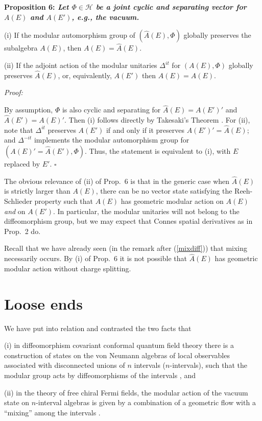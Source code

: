 \documentclass[12pt]{article}
\def \HH {\mathcal{H}}
\def \QED {\hspace*{\fill}$\square$\medskip}
\begin{document}
{\bf Proposition 6: \sl Let $\Phi\in\HH$ be a joint cyclic and
  separating vector for $A(E)$ and $A(E')$, e.g., the vacuum. 

(i) If the modular automorphism group of $(\widehat A(E),\Phi)$ globally
  preserves the subalgebra $A(E)$, then $A(E)=\widehat A(E)$.

(ii) If the adjoint action of the modular unitaries $\Delta^{it}$ for
  $(A(E),\Phi)$ globally preserves $\widehat A(E)$, or, equivalently,
  $A(E')$ then $A(E)=\widehat A(E)$. 

\medskip

\it Proof:} By assumption, $\Phi$ is also cyclic and separating 
for $\widehat A(E)=A(E')'$ and $\widehat A(E')=A(E)'$. Then (i)
follows directly by Takesaki's Theorem \cite[Chap.\ IX, Thm.\ 4.2]{T}. 
For (ii), note that $\Delta^{it}$ preserves $A(E')$ if and only if it
preserves $A(E')'=\widehat A(E)$; and $\Delta^{-it}$ implements the
modular automorphism group for $(A(E)'=\widehat A(E'),\Phi)$. Thus,
the statement is equivalent to (i), with $E$ replaced by $E'$. 
\QED

The obvious relevance of (ii) of Prop.\ 6 is that in the generic case
when $\widehat A(E)$ is strictly larger than $A(E)$, there can be no
vector state satisfying the Reeh-Schlieder property such that $A(E)$
has geometric modular action on $A(E)$ {\em and} on $A(E')$. In
particular, the modular unitaries will not belong to the
diffeomorphism group, but we may expect that Connes spatial
derivatives as in Prop.\ 2 do.  

Recall that we have already seen (in the remark after (\ref{mixdiff}))
that mixing necessarily occurs. By (i) of Prop.\ 6 it is not possible 
that $\widehat A(E)$ has geometric modular action without charge splitting.  

\section{Loose ends}
\label{sec:loose}

We have put into relation and contrasted the two facts that 

(i) in diffeomorphism covariant conformal quantum field theory there
is a construction of states on the von Neumann algebras of local
observables associated with disconnected unions of $n$ intervals
($n$-intervals), such that the modular group acts by diffeomorphisms
of the intervals \cite{KL05}, and  

(ii) in the theory of free chiral Fermi fields, the modular action of
the vacuum state on $n$-interval algebras is given by a combination of
a geometric flow with a ``mixing'' among the intervals \cite{CH}.  
\end{document}
